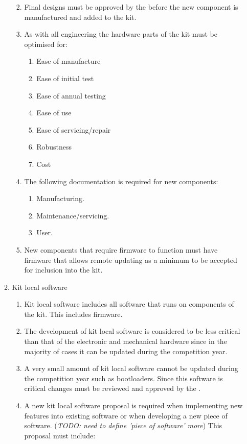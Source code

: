 \begin{enumerate}
\begin{enumerate}
\begin{enumerate}
\begin{enumerate}
          \end{enumerate}
        \item Final designs must be approved by the  before the new component is manufactured and added to the kit.
        \item As with all engineering the hardware parts of the kit must be optimised for:
          \begin{enumerate}
            \item Ease of manufacture
            \item Ease of initial test
            \item Ease of annual testing
            \item Ease of use
            \item Ease of servicing/repair
            \item Robustness
            \item Cost
          \end{enumerate}
        \item The following documentation is required for new components:
          \begin{enumerate}
            \item Manufacturing.
            \item Maintenance/servicing.
            \item User.
          \end{enumerate}
        \item New components that require firmware to function must have firmware that allows remote updating as a minimum to be accepted for inclusion into the kit.
      \end{enumerate}
    \item Kit local software
      \begin{enumerate}
        \item Kit local software includes all software that runs on components of the kit. This includes firmware.
        \item The development of kit local software is considered to be less critical than that of the electronic and mechanical hardware since in the majority of cases it can be updated during the competition year.
        \item A very small amount of kit local software cannot be updated during the competition year such as bootloaders. Since this software is critical changes must be reviewed and approved by the .
        \item A new kit local software proposal is required when implementing new features into existing software or when developing a new piece of software. (\emph{TODO: need to define 'piece of software' more}) This proposal must include:

\end{enumerate}
\end{enumerate}
\end{enumerate}
